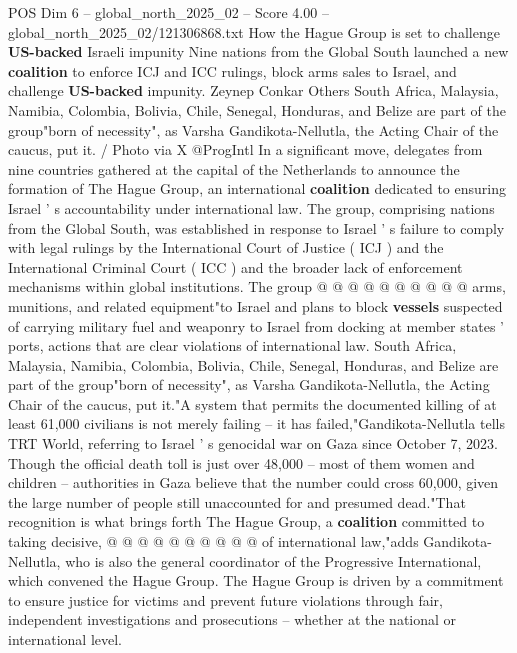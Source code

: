 \begin{textsample}{POS Dim 6 – global\_north\_2025\_02 – Score 4.00 – global\_north\_2025\_02/121306868.txt}  \label{ex:f6_pos_347}
How the Hague Group is set to challenge \textbf{US-backed} Israeli impunity Nine nations from the Global South launched a new \textbf{coalition} to enforce ICJ and ICC rulings, block arms sales to Israel, and challenge \textbf{US-backed} impunity.
Zeynep Conkar Others South Africa, Malaysia, Namibia, Colombia, Bolivia, Chile, Senegal, Honduras, and Belize are part of the group"born of necessity", as Varsha Gandikota-Nellutla, the Acting Chair of the caucus, put it. / Photo via X @ProgIntl In a significant move, delegates from nine countries gathered at the capital of the Netherlands to announce the formation of The Hague Group, an international \textbf{coalition} dedicated to ensuring Israel ' s accountability under international law.
The group, comprising nations from the Global South, was established in response to Israel ' s failure to comply with legal rulings by the International Court of Justice ( ICJ ) and the International Criminal Court ( ICC ) and the broader lack of enforcement mechanisms within global institutions.
The group @ @ @ @ @ @ @ @ @ @ arms, munitions, and related equipment"to Israel and plans to block \textbf{vessels} suspected of carrying military fuel and weaponry to Israel from docking at member states ' ports, actions that are clear violations of international law.
South Africa, Malaysia, Namibia, Colombia, Bolivia, Chile, Senegal, Honduras, and Belize are part of the group"born of necessity", as Varsha Gandikota-Nellutla, the Acting Chair of the caucus, put it."A system that permits the documented killing of at least 61,000 civilians is not merely failing -- it has failed,"Gandikota-Nellutla tells TRT World, referring to Israel ' s genocidal war on Gaza since October 7, 2023.
Though the official death toll is just over 48,000 -- most of them women and children -- authorities in Gaza believe that the number could cross 60,000, given the large number of people still unaccounted for and presumed dead."That recognition is what brings forth The Hague Group, a \textbf{coalition} committed to taking decisive, @ @ @ @ @ @ @ @ @ @ of international law,"adds Gandikota-Nellutla, who is also the general coordinator of the Progressive International, which convened the Hague Group.
The Hague Group is driven by a commitment to ensure justice for victims and prevent future violations through fair, independent investigations and prosecutions -- whether at the national or international level.

\end{textsample}
